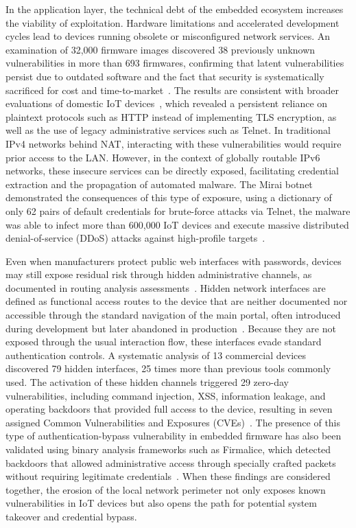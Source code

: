 In the application layer, the technical debt of the embedded ecosystem increases the viability of exploitation. Hardware limitations and accelerated development cycles lead to devices running obsolete or misconfigured network services. An examination of 32,000 firmware images discovered 38 previously unknown vulnerabilities in more than 693 firmwares, confirming that latent vulnerabilities persist due to outdated software and the fact that security is systematically sacrificed for cost and time-to-market~\cite{costin2014firmware}. The results are consistent with broader evaluations of domestic IoT devices~\cite{alrawi2019sok}, which revealed a persistent reliance on plaintext protocols such as HTTP instead of implementing TLS encryption, as well as the use of legacy administrative services such as Telnet. In traditional IPv4 networks behind NAT, interacting with these vulnerabilities would require prior access to the LAN. However, in the context of globally routable IPv6 networks, these insecure services can be directly exposed, facilitating credential extraction and the propagation of automated malware. The Mirai botnet demonstrated the consequences of this type of exposure, using a dictionary of only 62 pairs of default credentials for brute-force attacks via Telnet, the malware was able to infect more than 600,000 IoT devices and execute massive distributed denial-of-service (DDoS) attacks against high-profile targets~\cite{antonakakis2017mirai}.

Even when manufacturers protect public web interfaces with passwords, devices may still expose residual risk through hidden administrative channels, as documented in routing analysis assessments~\cite{liu2025eagleye}. Hidden network interfaces are defined as functional access routes to the device that are neither documented nor accessible through the standard navigation of the main portal, often introduced during development but later abandoned in production~\cite{liu2025eagleye}. Because they are not exposed through the usual interaction flow, these interfaces evade standard authentication controls. A systematic analysis of 13 commercial devices discovered 79 hidden interfaces, 25 times more than previous tools commonly used. The activation of these hidden channels triggered 29 zero-day vulnerabilities, including command injection, XSS, information leakage, and operating backdoors that provided full access to the device, resulting in seven assigned Common Vulnerabilities and Exposures (CVEs)~\cite{liu2025eagleye}. The presence of this type of authentication-bypass vulnerability in embedded firmware has also been validated using binary analysis frameworks such as Firmalice, which detected backdoors that allowed administrative access through specially crafted packets without requiring legitimate credentials~\cite{shoshitaishvili2015firmalice}. When these findings are considered together, the erosion of the local network perimeter not only exposes known vulnerabilities in IoT devices but also opens the path for potential system takeover and credential bypass.

